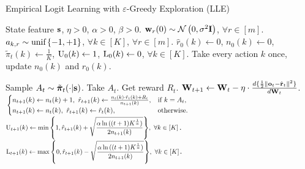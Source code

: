 \begin{algorithm}[t]
	\caption{Empirical Logit Learning with $\varepsilon$-Greedy Exploration (LLE)}
	\label{alg:logit_learning_eps_greedy_exploration}
	\begin{algorithmic}
		 State feature ${\mathbf{s}}$, $\eta > 0$, $\alpha > 0$, $\beta > 0$.
		\STATE ${\mathbf{w}}_r(0) \sim {\mathcal{N}}\left( 0, \sigma^2 {\mathbf{I}} \right)$, $\forall r \in [m]$. $a_{k, r} \sim {\text{unif}}\left\{-1, +1\right\}$, $\forall k \in [K]$, $\forall r \in [m]$.
		\STATE $\hat{r}_{0}(k) \gets 0$, $n_{0}(k) \gets 0$, $\tilde{\pi}_t(k) \gets \frac{1}{K}$, ${\text{U}}_{0}(k) \gets 1$, ${\text{L}}_{0}(k) \gets 0$, $\forall k \in [K]$.
		\STATE Take every action $k$ once, update $n_{0}(k)$ and $\hat{r}_{0}(k)$.
		
		\STATE Sample $A_{t} \sim \tilde{{\boldsymbol{\pi}}}_t(\cdot | {\mathbf{s}} )$. Take $A_{t}$. Get reward $R_t$.
		\STATE ${\mathbf{W}}_{t+1} \leftarrow {\mathbf{W}}_t - \eta \cdot \frac{d \{ \frac{1}{2} \left\| {\mathbf{o}}_t - \hat{{\mathbf{r}}}_t \right\|^2 \}}{d {\mathbf{W}}_t}$.
		\STATE $\scalemath{0.8}{  \left. 
		    \begin{cases}
		    n_{t+1}(k) \gets n_{t}(k) + 1, \ \hat{r}_{t+1}(k) \gets \frac{n_{t}(k) \cdot \hat{r}_{t}(k) + R_t }{n_{t+1}(k)}, & \text{if } k = A_t, \\
		    n_{t+1}(k) \gets n_{t}(k), \ \hat{r}_{t+1}(k) \gets \hat{r}_{t}(k), & \text{otherwise}.
		    \end{cases}
		    \right. }$
		\STATE $\scalemath{0.75}{ \ucb_{t+1}(k) \gets
		    \min{\left\{ 1, \hat{r}_{t+1}(k) + \sqrt{\frac{\alpha \ln{( (t+1) K^{\frac{1}{\alpha}})}}{2 n_{t+1}(k)}}\right\}}, \ \forall k \in [K] }$.
		\STATE $\scalemath{0.75}{ \lcb_{t+1}(k) \gets 
		    \max{\left\{ 0, \hat{r}_{t+1}(k) - \sqrt{\frac{\alpha \ln{( (t+1) K^{\frac{1}{\alpha}})}}{2 n_{t+1}(k)}}\right\}}, \ \forall k \in [K] } $.
		

\end{algorithmic}
\end{algorithm}
